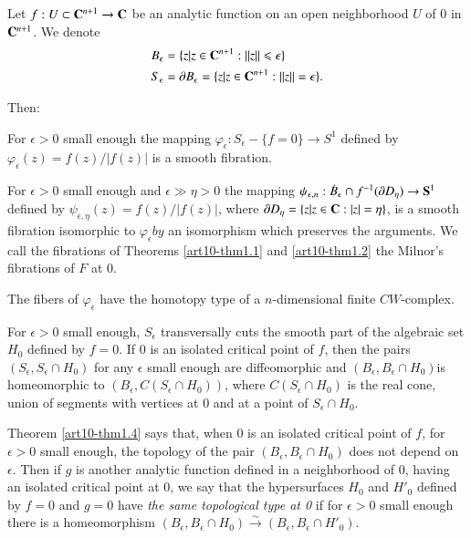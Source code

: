 Let $f: U \subset \mathbf{C}^{n+1} \to \mathbf{C}$ be an analytic function on an open neighborhood $U$ of 0 in $\mathbf{C}^{n+1}$. We denote
\begin{align*}
B_\epsilon & = \{z |z\in \mathbf{C}^{n+1} : || z || \leqslant \epsilon\}\\
S_\epsilon & = \partial B_\epsilon = \{z|z \in \mathbf{C}^{n+1} : ||z|| = \epsilon\}.
\end{align*}

Then:

\begin{thm}\label{art10-thm1.1}
For $\epsilon > 0$ small enough the mapping $\varphi_\epsilon : S_\epsilon - \{f=0\} \to S^1$ defined by $\varphi_\epsilon (z) = f(z)/|f(z)|$  is a smooth fibration.
\end{thm}

\begin{thm}\label{art10-thm1.2}
For $\epsilon >0$ small enough and $\epsilon \gg  \eta > 0$ the mapping $\psi_{\epsilon, n}: \dot{B}_\epsilon \cap f^{-1} (\partial D_\eta)\to \mathbf{S}^1$ defined by $\psi_{\epsilon, \eta}(z) = f(z)/ |f(z)|$, where $\partial D_\eta = \{z|z \in \mathbf{C}: |z| = \eta\}$, is a smooth fibration isomorphic to $\varphi_\epsilon by$ an isomorphism which preserves the arguments. We call the fibrations of Theorems \ref{art10-thm1.1} and \ref{art10-thm1.2} the Milnor's fibrations of $F$ at 0.
\end{thm}

\begin{corollary}\label{art10-coro1.3}
The fibers of $\varphi_\epsilon$ have the homotopy type of a $n$-dimen\-sional finite $CW$-complex.
\end{corollary}

\begin{thm}\label{art10-thm1.4}
For $\epsilon >0$ small enough, $S_\epsilon$ transversally cuts the smooth part of the algebraic set $H_0$ defined by $f=0$. If $0$ is an isolated critical point of $f$, then the pairs $(S_\epsilon, S_\epsilon \cap H_0)$ for any $\epsilon$ small enough are diffeomorphic and $(B_\epsilon, B_\epsilon \cap H_0)$\pageoriginale is homeomorphic to $(B_\epsilon, C (S_\epsilon \cap H_0))$, where $C (S_\epsilon \cap H_0)$ is the real cone, union of segments with vertices at 0 and at a point of $S_\epsilon \cap H_0$.
\end{thm}

Theorem \ref{art10-thm1.4} says that, when 0 is an isolated critical point of $f$, for $\epsilon > 0$ small enough, the topology of the pair $(B_\epsilon, B_\epsilon \cap H_0)$  does not depend on $\epsilon$. Then if $g$ is another analytic function defined in a neighborhood of 0, having an isolated critical point at 0, we say that the hypersurfaces $H_0$ and $H'_0$ defined by $f=0$ and $g=0$ have {\em the same topological type at 0 } if for $\epsilon >0$ small enough there is a homeomorphism $(B_\epsilon, B_\epsilon \cap H_0) \xrightarrow{\sim} (B_\epsilon, B_\epsilon \cap H'_0)$.

